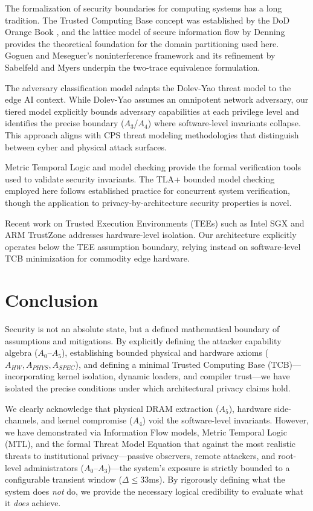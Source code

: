 \documentclass[conference]{IEEEtran}
\begin{document}
The formalization of security boundaries for computing systems has a long tradition. The Trusted Computing Base concept was established by the DoD Orange Book \cite{b3}, and the lattice model of secure information flow by Denning \cite{b12} provides the theoretical foundation for the domain partitioning used here. Goguen and Meseguer's noninterference framework \cite{b8} and its refinement by Sabelfeld and Myers \cite{b11} underpin the two-trace equivalence formulation.

The adversary classification model adapts the Dolev-Yao threat model \cite{b2} to the edge AI context. While Dolev-Yao assumes an omnipotent network adversary, our tiered model explicitly bounds adversary capabilities at each privilege level and identifies the precise boundary ($A_3$/$A_4$) where software-level invariants collapse. This approach aligns with CPS threat modeling methodologies \cite{b30_cps} that distinguish between cyber and physical attack surfaces.

Metric Temporal Logic \cite{b9} and model checking \cite{b10} provide the formal verification tools used to validate security invariants. The TLA+ bounded model checking employed here follows established practice for concurrent system verification, though the application to privacy-by-architecture security properties is novel.

Recent work on Trusted Execution Environments (TEEs) such as Intel SGX \cite{b16} and ARM TrustZone \cite{b17_tz} addresses hardware-level isolation. Our architecture explicitly operates below the TEE assumption boundary, relying instead on software-level TCB minimization for commodity edge hardware.

\section{Conclusion}

Security is not an absolute state, but a defined mathematical boundary of assumptions and mitigations. By explicitly defining the attacker capability algebra ($A_0$--$A_5$), establishing bounded physical and hardware axioms ($A_{HW}, A_{PHYS}, A_{SPEC}$), and defining a minimal Trusted Computing Base (TCB)---incorporating kernel isolation, dynamic loaders, and compiler trust---we have isolated the precise conditions under which architectural privacy claims hold. 

We clearly acknowledge that physical DRAM extraction ($A_5$), hardware side-channels, and kernel compromise ($A_4$) void the software-level invariants. However, we have demonstrated via Information Flow models, Metric Temporal Logic (MTL), and the formal Threat Model Equation that against the most realistic threats to institutional privacy---passive observers, remote attackers, and root-level administrators ($A_0$--$A_3$)---the system's exposure is strictly bounded to a configurable transient window ($\Delta \le 33$ms). By rigorously defining what the system does \textit{not} do, we provide the necessary logical credibility to evaluate what it \textit{does} achieve.
\end{document}
